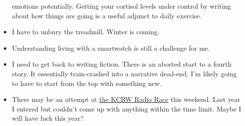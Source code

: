 \begin{itemize}
  emotions potentially. Getting your cortisol levels under control by
  writing about how things are going is a useful adjunct to daily
  exercise.
\item
  I have to unbury the treadmill. Winter is coming.
\item
  Understanding living with a smartwatch is still a challenge for me.
\item
  I need to get back to writing fiction. There is an aborted start to a
  fourth story. It essentially train-crashed into a narrative dead-end.
  I'm likely going to have to start from the top with something new.
\item
  There may be an attempt at \href{https://www.kcrw.com/radio-race}{the
  KCRW Radio Race} this weekend. Last year I entered but couldn't come
  up with anything within the time limit. Maybe I will have luck this
  year?
\end{itemize}
